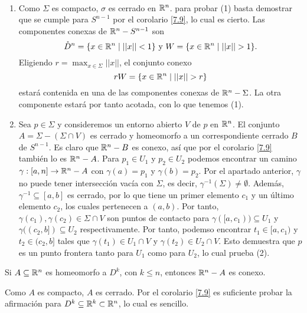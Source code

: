 \documentclass[CV.tex]{subfiles}
\begin{document}
\begin{dem}\
\begin{enumerate}
\item Como $\Sigma$ es compacto, $\sigma$ es cerrado en $\mathbb{R}^n$. para probar (1) basta demostrar que se cumple para $S^{n-1}$ por el corolario \ref{7.9}, lo cual es cierto. Las componentes conexas de $\mathbb{R}^n-S^{n-1}$ son 
\[
\mathring{D}^n=\{x\in\R^n\mid ||x||<1\}\text{ y }W=\{x\in\R^n\mid ||x||>1\}.
\]
Eligiendo $r=\max_{x\in\Sigma}||x||$, el conjunto conexo 
\[
rW=\{x\in\R^n\mid ||x||>r\}
\]
estará contenida en una de las componentes conexas de $\mathbb{R}^n-\Sigma$. La otra componente estará por tanto acotada, con lo que tenemos (1). 

\item Sea $p\in\Sigma$ y consideremos un entorno abierto $V$ de $p$ en $\mathbb{R}^n$. El conjunto $A=\Sigma-(\Sigma\cap V)$ es cerrado y homeomorfo a un correspondiente cerrado $B$ de $S^{n-1}$. Es claro que $\mathbb{R}^n-B$ es conexo, así que por el corolario \ref{7.9} también lo es $\mathbb{R}^n-A$. Para $p_1\in U_1$ y $p_2\in U_2$ podemos encontrar un camino $\gamma:[a,n]\to\mathbb{R}^n-A$ con $\gamma(a)=p_1$ y $\gamma(b)=p_2$. Por el apartado anterior, $\gamma$ no puede tener intersección vacía con $\Sigma$, es decir, $\gamma^{-1}(\Sigma)\neq\emptyset$. Además, $\gamma^{-1}\subseteq[a,b]$ es cerrado, por lo que tiene un primer elemento $c_1$ y un último elemento $c_2$, los cuales pertenecen a $(a,b)$. Por tanto, $\gamma(c_1),\gamma(c_2)\in\Sigma\cap V$ son puntos de contacto para $\gamma([a,c_1))\subseteq U_1$ y $\gamma((c_2,b])\subseteq U_2$ respectivamente. Por tanto, podemso encontrar $t_1\in [a,c_1)$ y $t_2\in (c_2,b]$ tales que $\gamma(t_1)\in U_1\cap V$ y $\gamma(t_2)\in U_2\cap V$. Esto demuestra que $p$ es un punto frontera tanto para $U_1$ como para $U_2$, lo cual prueba (2).\QED
\end{enumerate}
\end{dem}

\begin{teorema}
Si $A\subseteq\mathbb{R}^n$ es homeomorfo a $D^k$, con $k\leq n$, entonces $\mathbb{R}^n-A$ es conexo.
\end{teorema}
\begin{dem}
Como $A$ es compacto, $A$ es cerrado. Por el corolario \ref{7.9} es suficiente probar la afirmación para $D^k\subseteq\mathbb{R}^k\subset\mathbb{R}^n$, lo cual es sencillo. \QED
\end{dem}
\end{document}
